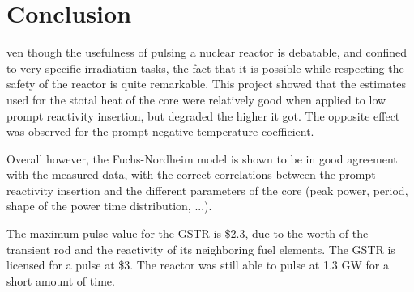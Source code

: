%
%
\let\textcircled=\pgftextcircled
\chapter{Conclusion}
\label{chap:conclusion}

ven though the usefulness of pulsing a nuclear reactor is debatable, and confined to very specific irradiation tasks, the fact that it is possible while respecting the safety of the reactor is quite remarkable. This project showed that the estimates used for the stotal heat of the core were relatively good when applied to low prompt reactivity insertion, but degraded the higher it got. The opposite effect was observed for the prompt negative temperature coefficient.

Overall however, the Fuchs-Nordheim model is shown to be in good agreement with the measured data, with the correct correlations between the prompt reactivity insertion and the different parameters of the core (peak power, period, shape of the power time distribution, ...).

The maximum pulse value for the GSTR is \$2.3, due to the worth of the transient rod and the reactivity of its neighboring fuel elements. The GSTR is licensed for a pulse at \$3. The reactor was still able to pulse at 1.3 GW for a short amount of time.



